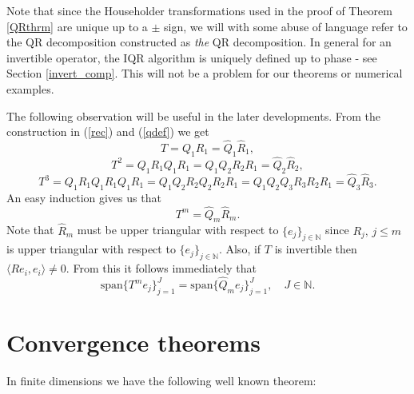 \documentclass[a4paper,10pt]{article}
\begin{document}
\begin{remark}
Note that since the Householder transformations used in the proof of Theorem \ref{QRthrm} are unique up to a $\pm$ sign, we will with some abuse of language refer to the QR decomposition constructed as {\it the} QR decomposition. In general for an invertible operator, the IQR algorithm is uniquely defined up to phase - see Section \ref{invert_comp}. This will not be a problem for our theorems or numerical examples.
\end{remark}

The following observation will be useful in the later
developments. From the construction in (\ref{rec}) and (\ref{qdef}) we
get 
\[
T = Q_1R_1 = \hat Q_1 \hat R_1,
\]
\[
T^2 = Q_1R_1Q_1R_1 = Q_1Q_2R_2R_1 = \hat Q_2 \hat R_2,
\]
\[
T^3 = Q_1R_1Q_1R_1Q_1R_1 = Q_1Q_2R_2Q_2R_2R_1 = Q_1Q_2Q_3R_3R_2R_1 =
\hat Q_3 \hat R_3.
\]
An easy induction gives us that 
\begin{equation}
\label{pwr_ref}
T^m = \hat Q_m \hat R_m.
\end{equation}
Note that $\hat R_m$ must be upper triangular with respect to
$\{e_j\}_{j\in\mathbb{N}}$ since $R_j, \, j \leq m$ is upper triangular with respect
to 
$\{e_j\}_{j\in\mathbb{N}}.$ Also, if $T$ is invertible then $\langle R
e_i,e_i\rangle \neq 0.$ From this it follows immediately that
\begin{equation}\label{usefulspan}
\mathrm{span}\{T^m e_j\}_{j=1}^J = \mathrm{span} \{\hat Q_me_j\}_{j=1}^J,
\quad J \in \mathbb{N}. 
\end{equation}




\section{Convergence theorems}
\label{conv_main}


In finite dimensions we have the following well known theorem:
\end{document}
